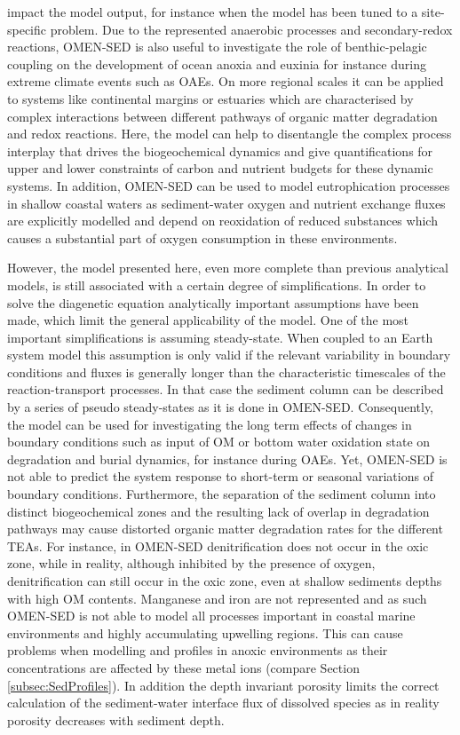 \documentclass[gmd, manuscript]{copernicus}
\begin{document}
impact the model output, for instance when the model has been tuned to a site-specific problem. 
Due to the represented anaerobic processes and secondary-redox reactions, OMEN-SED is also useful to investigate the role of benthic-pelagic coupling on the development of ocean anoxia and euxinia for instance during extreme climate 
events such as OAEs. On more regional scales it can be applied to systems like continental margins or estuaries which are characterised by complex interactions between different pathways of organic matter degradation and redox reactions. 
Here, the model can help to disentangle the complex process interplay that drives the biogeochemical dynamics and give quantifications for upper and lower constraints of carbon and nutrient budgets for these dynamic systems. 
In addition, OMEN-SED can be used to model eutrophication processes in shallow coastal waters as sediment-water oxygen and nutrient exchange fluxes are explicitly modelled and depend on reoxidation of reduced substances which causes 
a substantial part of oxygen consumption in these environments. %

However, the model presented here, even more complete than previous analytical models, is still associated with a certain degree of simplifications. In order to solve the diagenetic equation analytically important assumptions have been made, which limit 
the general applicability of the model. One of the most important simplifications is assuming steady-state. 
When coupled to an Earth system model this assumption is only valid if the relevant variability in boundary conditions and fluxes is generally longer than the characteristic timescales of the reaction-transport processes. 
In that case the sediment column can be described by a series of pseudo steady-states as it is done in OMEN-SED. Consequently, the model can be used for investigating the long term effects of changes in boundary conditions such as input of OM 
or bottom water oxidation state on degradation and burial dynamics, for instance during OAEs. Yet, OMEN-SED is not able to predict the system response to short-term or seasonal variations of boundary conditions. 
Furthermore, the separation of the sediment column into distinct biogeochemical zones and the resulting lack of overlap in degradation pathways may cause distorted organic matter degradation rates for the different TEAs. 
For instance, in OMEN-SED denitrification does not occur in the oxic zone, while in reality, although inhibited by the presence of oxygen, denitrification can still occur in the oxic zone, even at shallow sediments depths with high OM contents. 
Manganese and iron are not represented and as such OMEN-SED is not able to model all processes important in coastal marine environments and highly accumulating upwelling regions. This can cause problems when modelling  and  
profiles in anoxic environments as their concentrations are affected by these metal ions (compare Section \ref{subsec:SedProfiles}). 
In addition the depth invariant porosity limits the correct calculation of the sediment-water interface flux of dissolved species as in reality porosity decreases with sediment depth. 
\end{document}
